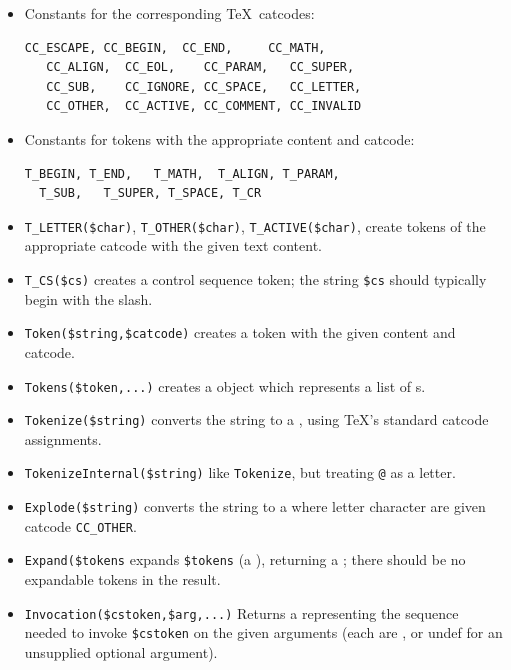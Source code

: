 \documentclass{book}
\newcommand{\ltxcode}{\lstinline[style=latexml]}
\begin{document}
\begin{itemize}
\item Constants for the corresponding \TeX\ catcodes:
\begin{lstlisting}[style=latexml]
   CC_ESCAPE, CC_BEGIN,  CC_END,     CC_MATH,
   CC_ALIGN,  CC_EOL,    CC_PARAM,   CC_SUPER,
   CC_SUB,    CC_IGNORE, CC_SPACE,   CC_LETTER,
   CC_OTHER,  CC_ACTIVE, CC_COMMENT, CC_INVALID
\end{lstlisting}
\item Constants for tokens with the appropriate content and catcode:
\begin{lstlisting}[style=latexml]
  T_BEGIN, T_END,   T_MATH,  T_ALIGN, T_PARAM,
  T_SUB,   T_SUPER, T_SPACE, T_CR
\end{lstlisting}
\item \ltxcode|T_LETTER($char)|, \ltxcode|T_OTHER($char)|, \ltxcode|T_ACTIVE($char)|,
  create tokens of the appropriate catcode with the given text content.
\item \ltxcode|T_CS($cs)| creates a control sequence token; 
  the string \ltxcode|$cs| should typically begin with the slash.
\item \ltxcode|Token($string,$catcode)| creates a token with the given content and catcode.
\item \ltxcode|Tokens($token,...)| creates a  object which
   represents a list of s.
\item \ltxcode|Tokenize($string)| converts the string to a ,
   using \TeX's standard catcode assignments.
\item \ltxcode|TokenizeInternal($string)| like \texttt{Tokenize}, but
   treating \ltxcode|@| as a letter.
\item \ltxcode|Explode($string)| converts the string to a  where
   letter character are given catcode \ltxcode|CC_OTHER|.
\item \ltxcode|Expand($tokens| expands \ltxcode|$tokens| (a ), returning
  a ; there should be no expandable tokens in the result.
\item \ltxcode|Invocation($cstoken,$arg,...)| Returns a  representing
  the sequence needed to invoke \ltxcode|$cstoken| on the given arguments (each are
  , or undef for an unsupplied optional argument).
\end{itemize}

\end{document}
